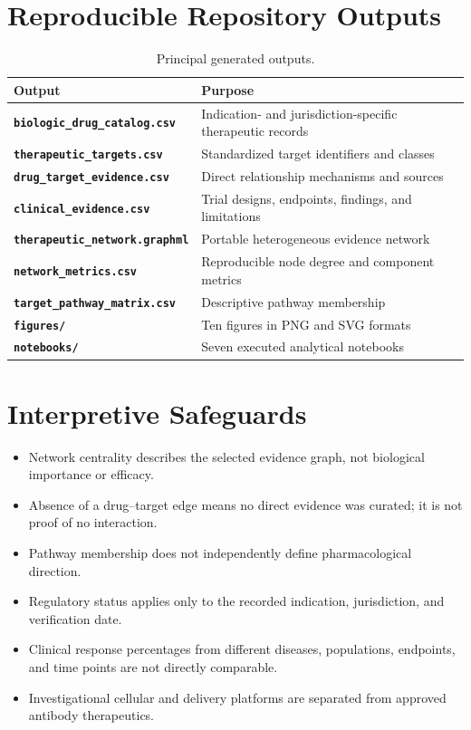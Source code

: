 \documentclass[12pt,a4paper]{article}
\begin{document}
\clearpage\appendix
\section{Reproducible Repository Outputs}
\begin{table}[htbp]\centering\small\caption{Principal generated outputs.}
\begin{tabularx}{\textwidth}{>{\bfseries}p{}Y}\toprule
Output & Purpose \\\midrule
\texttt{biologic\_drug\_catalog.csv} & Indication- and jurisdiction-specific therapeutic records \\
\texttt{therapeutic\_targets.csv} & Standardized target identifiers and classes \\
\texttt{drug\_target\_evidence.csv} & Direct relationship mechanisms and sources \\
\texttt{clinical\_evidence.csv} & Trial designs, endpoints, findings, and limitations \\
\texttt{therapeutic\_network.graphml} & Portable heterogeneous evidence network \\
\texttt{network\_metrics.csv} & Reproducible node degree and component metrics \\
\texttt{target\_pathway\_matrix.csv} & Descriptive pathway membership \\
\texttt{figures/} & Ten figures in PNG and SVG formats \\
\texttt{notebooks/} & Seven executed analytical notebooks \\\bottomrule
\end{tabularx}\end{table}

\section{Interpretive Safeguards}
\begin{itemize}
\item Network centrality describes the selected evidence graph, not biological importance or efficacy.
\item Absence of a drug--target edge means no direct evidence was curated; it is not proof of no interaction.
\item Pathway membership does not independently define pharmacological direction.
\item Regulatory status applies only to the recorded indication, jurisdiction, and verification date.
\item Clinical response percentages from different diseases, populations, endpoints, and time points are not directly comparable.
\item Investigational cellular and delivery platforms are separated from approved antibody therapeutics.
\end{itemize}
\end{document}
